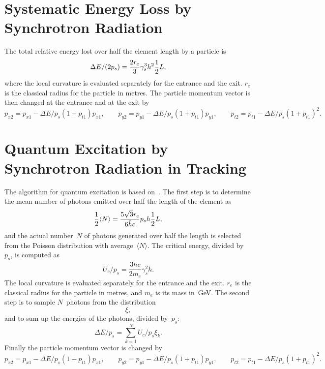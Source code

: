  
\section{Systematic Energy Loss by Synchrotron Radiation}
The total relative energy lost over half the element length by a
particle is
\begin{equation}
\Delta E/(2 p_s) = \frac{2 r_e}{3} \gamma_s^3 h^2 \frac{1}{2} L,
\end{equation}
where the local curvature is evaluated separately for the entrance and
the exit.
$r_e$ is the classical radius for the particle in metres.
The particle momentum vector is then changed at the entrance and at the
exit by
\begin{equation}
p_{x2} = p_{x1} - \Delta E/p_s (1 + p_{t1}) p_{x1}, \qquad
p_{y2} = p_{y1} - \Delta E/p_s (1 + p_{t1}) p_{y1}, \qquad
p_{t2} = p_{t1} - \Delta E/p_s (1 + p_{t1})^2.
\end{equation}
 
 
\section{Quantum Excitation by Synchrotron Radiation in Tracking}
The algorithm for quantum excitation is based on~\cite{JOW80}.
The first step is to determine the mean number of photons emitted over
half the length of the element as
\begin{equation}
\frac{1}{2} \langle N \rangle = \frac{5\sqrt{3}r_e}{6 \bar{h} c}p_s h \frac{1}{2} L,
\end{equation}
and the actual number~$N$ of photons generated over half the length
is selected from the Poisson distribution with
average~$\langle N \rangle$. 
The critical energy, divided by~$p_s$, is computed as
\begin{equation}
U_c/p_s = \frac{3\bar{h}c}{2m_e}\gamma_s^2 h.
\end{equation}
The local curvature is evaluated separately for the entrance and the
exit.
$r_e$ is the classical radius for the particle in metres,
and $m_e$ is its mass in~GeV.
The second step is to sample $N$~photons from the distribution
\begin{equation}
\xi,
\end{equation}
and to sum up the energies of the photons, divided by~$p_s$:
\begin{equation}
\Delta E/p_s = \sum_{k=1}^N U_c/p_s \xi_k.
\end{equation}
Finally the particle momentum vector is changed by
\begin{equation}
p_{x2} = p_{x1} - \Delta E/p_s (1 + p_{t1}) p_{x1}, \qquad
p_{y2} = p_{y1} - \Delta E/p_s (1 + p_{t1}) p_{y1}, \qquad
p_{t2} = p_{t1} - \Delta E/p_s (1 + p_{t1})^2.
\end{equation}
 
